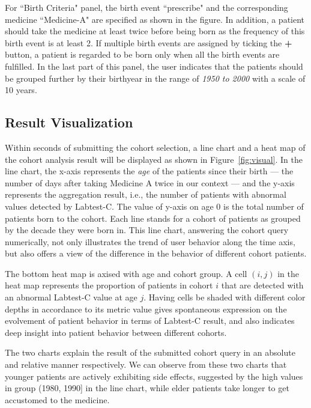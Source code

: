 For ``Birth Criteria" panel, the birth event ``prescribe" and the corresponding medicine ``Medicine-A" are specified as shown in the figure.
In addition, a patient should take the medicine at least twice before being 
born as the frequency of this birth event is at least 2.
If multiple birth events are assigned by ticking the \textbf{+} button, a 
patient is regarded to be born only when all the birth events are fulfilled. 
In the last part of this panel, the user indicates that the patients should be grouped further by their birthyear in the range of \emph{1950 to 2000} with a scale of 10 years.

\subsection{Result Visualization}

Within seconds of submitting the cohort selection, a line chart and a heat map of the cohort analysis result will be displayed as shown in Figure~\ref{fig:visual}. In the line chart, the x-axis represents the \emph{age} of the patients since their {birth} --- the number of days after taking Medicine A twice in our context --- and the y-axis represents the aggregation result, i.e., the number of patients with abnormal values detected by Labtest-C. The value of y-axis on {age 0} is the total number of patients {born} to the cohort. 
Each line stands for a cohort of patients as grouped by the decade they were born in. 
This line chart, answering the cohort query numerically, not only illustrates the trend of user behavior along the time axis, but also offers a view of
the difference in the behavior of different cohort patients.

The bottom heat map is axised with {age} and cohort group. 
A cell $(i,j)$ in the heat map represents the proportion of patients in cohort $i$ that are detected with an abnormal Labtest-C value at age $j$. 
Having cells be shaded with different color depths in accordance to its metric value gives spontaneous expression on the evolvement of patient behavior in terms of Labtest-C result, and also indicates deep insight into patient behavior between different cohorts. 

The two charts explain the result of the submitted cohort query in an absolute and relative manner respectively. We can observe from these two charts that younger patients are actively exhibiting side effects, suggested by the high values in group (1980, 1990] in the line chart, while elder patients take longer to get accustomed to the medicine.%

